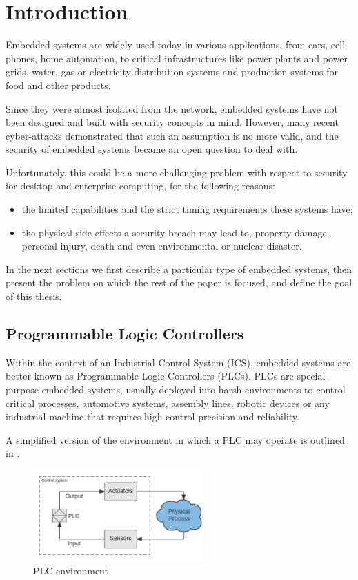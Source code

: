 \chapter{Introduction}
\label{chap:intro}

Embedded systems are widely used today in various applications, from cars, cell phones, home automation, to critical infrastructures
like power plants and power grids, water, gas or electricity distribution systems and production systems for food and other products.

Since they were almost isolated from the network, embedded systems have not been designed and built with security concepts in mind.
However, many recent cyber-attacks demonstrated that such an assumption is no more valid, and the security of embedded systems became an open question to deal with.

Unfortunately, this could be a more challenging problem with respect to security for desktop and enterprise computing, for the following reasons:
\begin{itemize}[itemsep=2pt,topsep=0pt]
	\item the limited capabilities and the strict timing requirements these systems have;
	\item the physical side effects a security breach may lead to, \eg property damage, personal injury, death and even environmental or nuclear disaster.
\end{itemize}

In the next sections we first describe a particular type of embedded systems, then present the problem on which the rest of the paper is focused,
and define the goal of this thesis.


\section{Programmable Logic Controllers}

Within the context of an Industrial Control System (ICS), embedded systems are better known as Programmable Logic Controllers (PLCs).
PLCs are special-purpose embedded systems, usually deployed into harsh environments to control critical processes,
\eg automotive systems, assembly lines, robotic devices or any industrial machine that requires high control precision and reliability.

A simplified version of the environment in which a PLC may operate is outlined in .
\begin{figure}[h]
\centerline{\includegraphics[width=0.6\textwidth]{res/plc-env}}
\caption{PLC environment\label{fig:plc-env}}
\end{figure}

